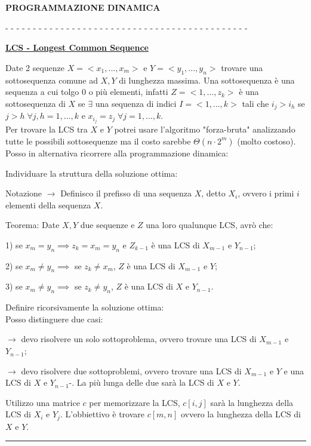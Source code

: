 \documentclass[8pt]{extarticle}
\newenvironment{formulario}
{
\setlength{\columnsep}{3em}
\twocolumn
\lstset{tabsize=3}
\begin{spacing}{1}
\begin{flushleft}
}{
\end{flushleft}
\end{spacing}
}
\newenvironment{tcenter}{
  \par
  \centering
  \setlength{\parskip}{0pt} %
  \noindent
}{
  \par
}
\newenvironment{Descr}
{
	\begin{description}[topsep=0pt,itemsep=0pt,partopsep=0pt, parsep=0pt]
}{
	\end{description}
}
\newenvironment{myParagraph}[1]
{
\begin{tcenter}
\textbf{#1}
\end{tcenter}
}{
\myRule
}
\newenvironment{subParagraph}[1]
{
\dashrule
\begin{tcenter}
\bo{\underline{#1}}\\
\end{tcenter}
}{}
\newcommand{\myRule}{\rule{250pt}{0.1pt}}
\newcommand{\bo}[1]{\textbf{#1}}
\newcommand{\ra}{\rightarrow}
\newcommand{\dashrule}{\begin{tcenter}- - - - - - - - - - - - - - - - - - - - - - - - - - - - - - - - - - - - - - - - - - - - \; \end{tcenter}}
\begin{document}
\begin{formulario}
\begin{myParagraph}{PROGRAMMAZIONE DINAMICA}
		\begin{subParagraph}{LCS - Longest Common Sequence}
Date 2 sequenze $X=<x_1,...,x_m>$ e $Y=<y_1,...,y_n>$ trovare una sottosequenza comune ad $X,Y$ di lunghezza massima. Una sottosequenza è una sequenza a cui tolgo $0$ o più elementi, infatti $Z=<1,...,z_k>$ è una sottosequenza di $X$ se $\exists$ una sequenza di indici $I=<1,...,k>$ tali che $i_j>i_h$ se $j>h\;\forall j,h=1,...,k$ e $x_{i_j}=z_j \; \forall j=1,...,k$.\\
Per trovare la LCS tra $X$ e $Y$ potrei usare l'algoritmo "forza-bruta" analizzando tutte le possibili sottosequenze ma il costo sarebbe $\Theta(n\cdot 2^m)$ (molto costoso). Posso in alternativa ricorrere alla programmazione dinamica:
			\begin{itemize}
		\item Individuare la struttura della soluzione ottima:\\
				\begin{Descr}
			\item[Notazione] $\ra$ Definisco il prefisso di una sequenza $X$, detto $X_i$, ovvero i primi $i$ elementi della sequenza $X$.
			\item[Teorema:] Date $X,Y$ due sequenze e $Z$ una loro qualunque LCS, avrò che:
					\begin{Descr}
				\item[1)] se $x_m=y_n \implies z_k=x_m=y_n$ e $Z_{k-1}$ è una LCS di $X_{m-1}$ e $Y_{n-1}$;
				\item[2)] se $x_m \neq y_n \implies$ se $z_k \neq x_m$, $Z$ è una LCS di $X_{m-1}$ e $Y$;
				\item[3)] se $x_m \neq y_n \implies$ se $z_k \neq y_n$, $Z$ è una LCS di $X$ e $Y_{n-1}$.
					\end{Descr}
				\end{Descr}
		\item Definire ricorsivamente la soluzione ottima:\\
Posso distinguere due casi:
				\begin{Descr}
			\item[\bm{$x_m = y_n$}] $\ra$ devo risolvere un solo sottoproblema, ovvero trovare una LCS di $X_{m-1}$ e $Y_{n-1}$;
			\item[\bm{$x_m \neq y_n$}] $\ra$ devo risolvere due sottoproblemi, ovvero trovare una LCS di $X_{m-1}$ e $Y$ e una LCS di $X$ e $Y_{n-1}$-. La più lunga delle due sarà la LCS di $X$ e $Y$.
 				\end{Descr}
Utilizzo una matrice $c$ per memorizzare la LCS, $c[i,j]$ sarà la lunghezza della LCS di $X_i$ e $Y_j$. L'obbiettivo è trovare $c[m,n]$ ovvero la lunghezza della LCS di $X$ e $Y$. \\

\end{itemize}
\end{subParagraph}
\end{myParagraph}
\end{formulario}
\end{document}
